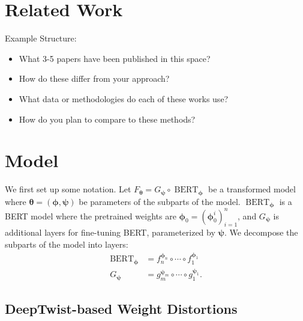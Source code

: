 \documentclass{article}
\newcommand{\bert}{\operatorname{BERT}}
\newcommand{\btheta}{{\bm{\theta}}}
\newcommand{\bphi}{{\bm{\phi}}}
\newcommand{\bpsi}{{\bm{\psi}}}
\begin{document}

\section{Related Work}

Example Structure:
\begin{itemize}
\item What 3-5 papers have been published in this space?
\item How do these  differ from your approach?
\item What data or methodologies do each of these works use?
\item How do you plan to compare to these methods?
\end{itemize}

\cite{cheng2017survey}



\section{Model}

We first set up some notation. Let $F_\btheta = G_\bpsi \circ \bert_\bphi$ be a
transformed model where
$\btheta = (\bphi, \bpsi)$ be parameters of the subparts of the model.
$\bert_\bphi$ is a BERT model where the pretrained weights are $\bphi_0 = 
(\bphi_0^i)_{i=1}^n$, and
$G_\bpsi$ is additional layers for fine-tuning BERT, parameterized by $\bpsi$.
We decompose the subparts of the model into layers: \begin{align*}
\bert_\bphi &= f_{n}^{\bphi_n} \circ \cdots \circ f_1^{\bphi_1} \\
G_\bpsi &= g_{m}^{\bpsi_m} \circ \cdots \circ g_1^{\bpsi_1}.
\end{align*}

\subsection{DeepTwist-based Weight Distortions}
\end{document}
